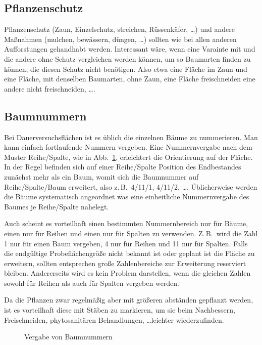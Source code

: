 \documentclass[twocolumn]{scrartcl}
\begin{document}
\subsection{Pflanzenschutz}

Pflanzenschutz (Zaun, Einzelschutz, streichen, Rüssenkäfer, \dots) und andere
Maßnahmen (mulchen, bewässern, düngen, \dots) sollten wie bei allen anderen
Aufforstungen gehandhabt werden. Interessant wäre, wenn eine Varainte mit und
die andere ohne Schutz vergleichen werden können, um so Baumarten finden zu
können, die diesen Schutz nicht benötigen. Also etwa eine Fläche im Zaun und
eine Fläche, mit denselben Baumarten, ohne Zaun, eine Fläche freischneiden eine
andere nicht freischneiden, \dots.

\subsection{Baumnummern}

Bei Dauerversuchsflächen ist es üblich die einzelnen Bäume zu nummerieren. Man
kann einfach fortlaufende Nummern vergeben. Eine Nummernvergabe nach dem Muster
Reihe/Spalte, wie in Abb.~\ref{fig:baumnummern}, erleichtert die Orientierung
auf der Fläche. In der Regel befinden sich auf einer Reihe/Spalte Position des
Endbestandes zunächst mehr als ein Baum, womit sich die Baumnummer auf
Reihe/Spalte/Baum erweitert, also z.\,B.\ 4/11/1, 4/11/2, \dots. Üblicherweise
werden die Bäume systematisch angeordnet was eine einheitliche Nummernvergabe
des Baumes je Reihe/Spalte nahelegt.

Auch scheint es vorteilhaft einen bestimmten Nummernbereich nur für Bäume, einen
nur für Reihen und einen nur für Spalten zu verwenden. Z.\,B.\ wird die Zahl 1
nur für einen Baum vergeben, 4 nur für Reihen und 11 nur für Spalten. Falls die
endgültige Probeflächengröße nicht bekannt ist oder geplant ist die Fläche zu
erweitern, sollten entsprechen große Zahlenbereiche zur Erweiterung reserviert
bleiben. Andererseits wird es kein Problem darstellen, wenn die gleichen Zahlen
sowohl für Reihen als auch für Spalten vergeben werden.

Da die Pflanzen zwar regelmäßig aber mit größeren abständen gepflanzt werden,
ist es vorteilhaft diese mit Stäben zu markieren, um sie beim Nachbessern,
Freischneiden, phytosanitären Behandlungen, \dots leichter wiederzufinden.

\begin{figure}[htbp]
  \centering
  \caption{Vergabe von Baumnummern}
  \label{fig:baumnummern}
\end{figure}
\end{document}
